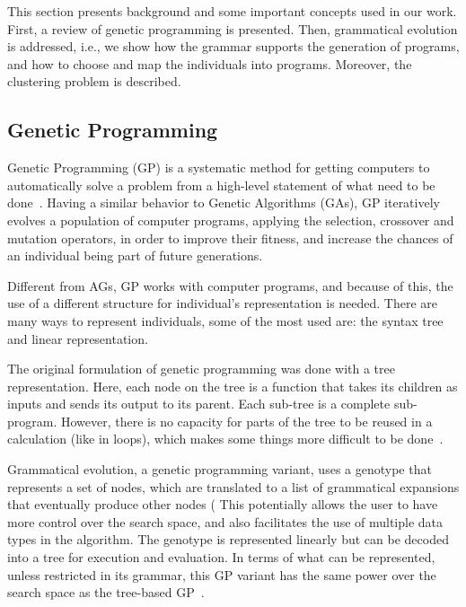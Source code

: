 \documentclass[journal]{IEEEtran}
\begin{document}
	This section presents background and some important concepts used in our work. First, a review of genetic programming is presented. Then, grammatical evolution is addressed, i.e., we show how the grammar supports the generation of programs, and how to choose and map the individuals into programs. Moreover, the clustering problem is described.
	
	
	\subsection{Genetic Programming}
	
	Genetic Programming (GP) is a systematic method for getting computers to automatically solve a problem from a high-level statement of what need to be done~\cite{koza2005genetic}. Having a similar behavior to Genetic Algorithms (GAs), GP iteratively evolves a population of computer programs, applying the selection, crossover and mutation operators, in order to improve their fitness, and increase the chances of an individual being part of future generations.
	
	Different from AGs, GP works with computer programs, and because of this, the use of a different structure for individual's representation is needed. There are many ways to represent individuals, some of the most used are: the syntax tree and linear representation.
	
	The original formulation of genetic programming was done with a tree representation. Here, each node on the tree is a function that takes its children as inputs and sends its output to its parent. Each sub-tree is a complete sub-program. However, there is no capacity for parts of the tree to be reused in a calculation (like in loops), which makes some things more difficult to be done~\cite{harris2015comparison}. 
	

	Grammatical evolution, a genetic programming variant, uses a genotype that represents a set of nodes, which are translated to a list of grammatical expansions that eventually produce other nodes (%
This potentially allows the user to have more control over the search space, and also facilitates the use of multiple data types in the algorithm. The genotype is represented linearly but can be decoded into a tree for execution and evaluation. In terms of what can be represented, unless restricted in its grammar, this GP variant has the same power over the search space as the tree-based GP~\cite{harris2015comparison}.
	
\end{document}

